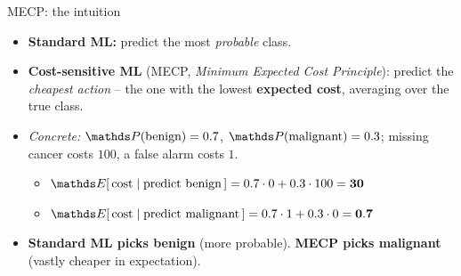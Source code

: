 \documentclass[11pt,compress,t,notes=noshow, xcolor=table]{beamer}
\begin{document}
\begin{frame}{MECP: the intuition}
    \begin{itemize}
        \item \textbf{Standard ML:} predict the most \emph{probable} class.
        \item \textbf{Cost-sensitive ML} (MECP, \emph{Minimum Expected Cost Principle}): predict the \emph{cheapest action} -- the one with the lowest \textbf{expected cost}, averaging over the true class.

        \vspace{4pt}
        \item \emph{Concrete:} $\P(\text{benign})=0.7$, $\P(\text{malignant})=0.3$; missing cancer costs $100$, a false alarm costs $1$.
        \begin{itemize}
            \item $\E[\,\text{cost} \mid \text{predict benign}\,] = 0.7 \cdot 0 + 0.3 \cdot 100 = \mathbf{30}$
            \item $\E[\,\text{cost} \mid \text{predict malignant}\,] = 0.7 \cdot 1 + 0.3 \cdot 0 = \mathbf{0.7}$
        \end{itemize}

        \vspace{4pt}
        \item \textbf{Standard ML picks benign} (more probable). \textbf{MECP picks malignant} (vastly cheaper in expectation).
    \end{itemize}
\end{frame}
\end{document}
